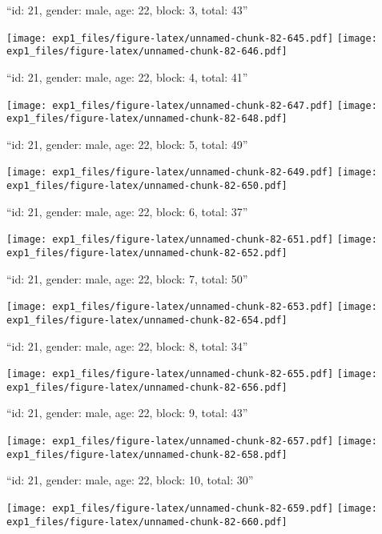 \documentclass[11pt,,]{article}
\begin{document}
\newpage
[1] 

``id: 21, gender: male, age: 22, block: 3, total: 43''

\texttt{[image: exp1\_files/figure-latex/unnamed-chunk-82-645.pdf]}
\texttt{[image: exp1\_files/figure-latex/unnamed-chunk-82-646.pdf]}

\newpage
[1] 

``id: 21, gender: male, age: 22, block: 4, total: 41''

\texttt{[image: exp1\_files/figure-latex/unnamed-chunk-82-647.pdf]}
\texttt{[image: exp1\_files/figure-latex/unnamed-chunk-82-648.pdf]}

\newpage
[1] 

``id: 21, gender: male, age: 22, block: 5, total: 49''

\texttt{[image: exp1\_files/figure-latex/unnamed-chunk-82-649.pdf]}
\texttt{[image: exp1\_files/figure-latex/unnamed-chunk-82-650.pdf]}

\newpage
[1] 

``id: 21, gender: male, age: 22, block: 6, total: 37''

\texttt{[image: exp1\_files/figure-latex/unnamed-chunk-82-651.pdf]}
\texttt{[image: exp1\_files/figure-latex/unnamed-chunk-82-652.pdf]}

\newpage
[1] 

``id: 21, gender: male, age: 22, block: 7, total: 50''

\texttt{[image: exp1\_files/figure-latex/unnamed-chunk-82-653.pdf]}
\texttt{[image: exp1\_files/figure-latex/unnamed-chunk-82-654.pdf]}

\newpage
[1] 

``id: 21, gender: male, age: 22, block: 8, total: 34''

\texttt{[image: exp1\_files/figure-latex/unnamed-chunk-82-655.pdf]}
\texttt{[image: exp1\_files/figure-latex/unnamed-chunk-82-656.pdf]}

\newpage
[1] 

``id: 21, gender: male, age: 22, block: 9, total: 43''

\texttt{[image: exp1\_files/figure-latex/unnamed-chunk-82-657.pdf]}
\texttt{[image: exp1\_files/figure-latex/unnamed-chunk-82-658.pdf]}

\newpage
[1] 

``id: 21, gender: male, age: 22, block: 10, total: 30''

\texttt{[image: exp1\_files/figure-latex/unnamed-chunk-82-659.pdf]}
\texttt{[image: exp1\_files/figure-latex/unnamed-chunk-82-660.pdf]}
\end{document}
